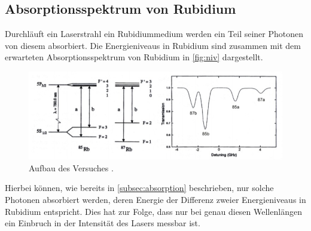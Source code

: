 \subsection{Absorptionsspektrum von Rubidium}

Durchläuft ein Laserstrahl ein Rubidiummedium werden ein Teil seiner Photonen von diesem absorbiert. Die Energieniveaus in Rubidium sind zusammen mit dem erwarteten Absorptionsspektrum
von Rubidium in \autoref{fig:niv} dargestellt.

\begin{figure}[H]
    \centering
    \includegraphics[width=\textwidth]{data/niveaus.jpg}
    \caption{Aufbau des Versuches \cite{Anleitung60}.}
    \label{fig:niv}
\end{figure}
\noindent
Hierbei können, wie bereits in \autoref{subsec:absorption} beschrieben, nur solche Photonen absorbiert werden, deren Energie der Differenz zweier Energieniveaus in Rubidium entspricht.
Dies hat zur Folge, dass nur bei genau diesen Wellenlängen ein Einbruch in der Intensität des Lasers messbar ist.
